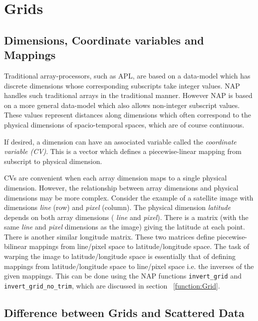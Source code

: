     \section{Grids}

  \subsection{
    \label{Dims}Dimensions, Coordinate variables and Mappings
  }
Traditional array-processors, such as APL, are based on a
  data-model which has discrete dimensions whose corresponding
  subscripts take integer values. NAP handles such traditional arrays
  in the traditional manner. However NAP is based on a more general
  data-model which also allows non-integer subscript values. These
  values represent distances along dimensions which often correspond to
  the physical dimensions of spacio-temporal spaces, which are of
  course continuous.
  \par If desired, a dimension can have an associated variable called the
  \textit{coordinate variable (CV)}. This is a vector which defines a
  piecewise-linear mapping from subscript to physical dimension.
  \par CVs are convenient when each array dimension maps to a single
  physical dimension. However, the relationship between array
  dimensions and physical dimensions may be more complex. Consider the
  example of a satellite image with dimensions 
  \textit{line} (row) and 
  \textit{pixel} (column). The physical dimension 
  \textit{latitude} depends on both array dimensions ( 
  \textit{line} and 
  \textit{pixel}). There is a matrix (with the same 
  \textit{line} and 
  \textit{pixel} dimensions as the image) giving the latitude at each
  point. There is another similar longitude matrix. These two matrices
  define piecewise-bilinear mappings from line/pixel space to
  latitude/longitude space. The task of warping the image to
  latitude/longitude space is essentially that of defining mappings
  from latitude/longitude space to line/pixel space i.e. the inverses
  of the given mappings. This can be done using the NAP functions 
{\texttt{invert\_grid} and \texttt{invert\_grid\_no\_trim}},
which are discussed in section ~\ref{function:Grid}.

  \subsection{
    \label{Dif}Difference between Grids and Scattered Data
  }

